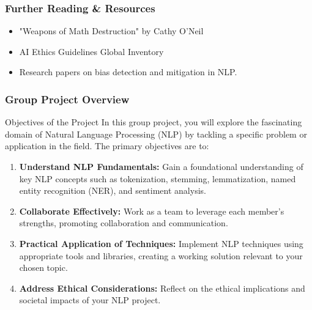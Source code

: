 \documentclass{beamer}
\begin{document}
\begin{frame}[fragile]
    \frametitle{Further Reading & Resources}
    \begin{itemize}
        \item "Weapons of Math Destruction" by Cathy O'Neil
        \item AI Ethics Guidelines Global Inventory
        \item Research papers on bias detection and mitigation in NLP.
    \end{itemize}
\end{frame}

\begin{frame}
    \frametitle{Group Project Overview}
    \begin{block}{Objectives of the Project}
        In this group project, you will explore the fascinating domain of Natural Language Processing (NLP) by tackling a specific problem or application in the field. The primary objectives are to:
        \begin{enumerate}
            \item \textbf{Understand NLP Fundamentals:} Gain a foundational understanding of key NLP concepts such as tokenization, stemming, lemmatization, named entity recognition (NER), and sentiment analysis.
            \item \textbf{Collaborate Effectively:} Work as a team to leverage each member's strengths, promoting collaboration and communication.
            \item \textbf{Practical Application of Techniques:} Implement NLP techniques using appropriate tools and libraries, creating a working solution relevant to your chosen topic.
            \item \textbf{Address Ethical Considerations:} Reflect on the ethical implications and societal impacts of your NLP project.
        \end{enumerate}
    \end{block}
\end{frame}
\end{document}
